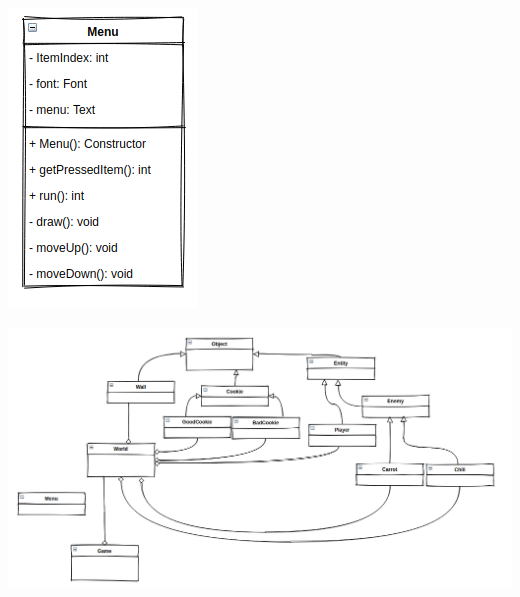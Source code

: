 \documentclass{TDP005mall}
\begin{document}
\newpage
\begin{center}
\includegraphics{umlMenu.png}
\end{center}
\newpage
\begin{center}
\includegraphics[scale = 0.45]{umlConnection.png}
\end{center}
\end{document}
